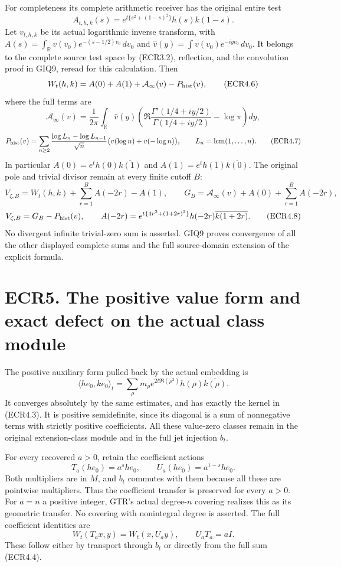For completeness its complete arithmetic receiver has the original
entire test \[
A_{t,h,k}(s)=e^{t\{s^2+(1-s)^2\}}
h(s)\overline{k(1-\overline s)}.
\tag{ECR4.5}
\] Let \(v_{t,h,k}\) be its actual logarithmic inverse transform, with
\(A(s)=\int_{\mathbb R}v(v_0)e^{-(s-1/2)v_0}\,dv_0\) and
\(\widehat v(y)=\int v(v_0)e^{-iyv_0}\,dv_0\). It belongs to the
complete source test space by (ECR3.2), reflection, and the convolution
proof in GIQ9, reread for this calculation. Then \[
W_t(h,k)=A(0)+A(1)+\mathcal A_\infty(v)-P_{\rm hist}(v),
\tag{ECR4.6}
\] where the full terms are \[
\mathcal A_\infty(v)=\frac1{2\pi}\int_{\mathbb R}\widehat v(y)
\left(\Re\frac{\Gamma'(1/4+iy/2)}{\Gamma(1/4+iy/2)}-\log\pi\right)dy,
\] \[
P_{\rm hist}(v)=\sum_{n\ge2}\frac{\log L_n-\log L_{n-1}}{\sqrt n}
\bigl(v(\log n)+v(-\log n)\bigr),\qquad
L_n=\operatorname{lcm}(1,\ldots,n).
\tag{ECR4.7}
\] In particular \(A(0)=e^t h(0)\overline{k(1)}\) and
\(A(1)=e^t h(1)\overline{k(0)}\). The original pole and trivial divisor
remain at every finite cutoff \(B\): \[
V_{\zeta,B}=W_t(h,k)+\sum_{r=1}^B A(-2r)-A(1),
\qquad
G_B=\mathcal A_\infty(v)+A(0)+\sum_{r=1}^B A(-2r),
\] \[
V_{\zeta,B}=G_B-P_{\rm hist}(v),\qquad
A(-2r)=e^{t\{4r^2+(1+2r)^2\}}h(-2r)\overline{k(1+2r)}.
\tag{ECR4.8}
\] No divergent infinite trivial-zero sum is asserted. GIQ9 proves
convergence of all the other displayed complete sums and the full
source-domain extension of the explicit formula.

\section{ECR5. The positive value form and exact defect on the actual
class
module}\label{ecr5.-the-positive-value-form-and-exact-defect-on-the-actual-class-module}

The positive auxiliary form pulled back by the actual embedding is \[
\langle h e_0,k e_0\rangle_t
=\sum_\rho m_\rho e^{2t\Re(\rho^2)}
h(\rho)\overline{k(\rho)}.
\tag{ECR5.1}
\] It converges absolutely by the same estimates, and has exactly the
kernel in (ECR4.3). It is positive semidefinite, since its diagonal is a
sum of nonnegative terms with strictly positive coefficients. All these
value-zero classes remain in the original extension-class module and in
the full jet injection \(b_t\).

For every recovered \(a>0\), retain the coefficient actions \[
T_a(h e_0)=a^s h e_0,\qquad U_a(h e_0)=a^{1-s}h e_0.
\tag{ECR5.2}
\] Both multipliers are in \(M\), and \(b_t\) commutes with them because
all these are pointwise multipliers. Thus the coefficient transfer is
preserved for every \(a>0\). For \(a=n\) a positive integer, GTR's
actual degree-\(n\) covering realizes this as its geometric transfer. No
covering with nonintegral degree is asserted. The full coefficient
identities are \[
W_t(T_a x,y)=W_t(x,U_a y),\qquad U_aT_a=aI.
\tag{ECR5.3}
\] These follow either by transport through \(b_t\) or directly from the
full sum (ECR4.4).

